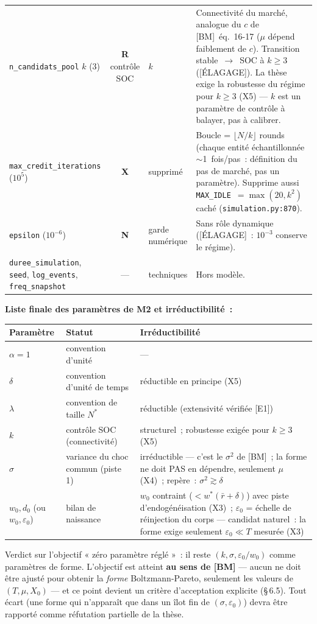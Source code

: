 \documentclass[11pt,a4paper]{article}
\begin{document}
\begin{xltabular}{\linewidth}{@{}>{\raggedright\arraybackslash}p{3.1cm}c>{\raggedright\arraybackslash}p{2.7cm}X@{}}
\texttt{n_candidats_pool} $k$ (3) & \textbf{R} contrôle SOC & $k$ & Connectivité du marché, analogue du $c$ de [BM]~éq.~16-17 ($\mu$ dépend faiblement de $c$). Transition stable~$\to$~SOC à $k\geq 3$ ([ÉLAGAGE]). La thèse exige la robustesse du régime pour $k\geq 3$ (X5) --- $k$ est un paramètre de contrôle à balayer, pas à calibrer. \\
\texttt{max_credit_iterations} ($10^5$) & \textbf{X} & supprimé & Boucle = $\lfloor N/k \rfloor$ rounds (chaque entité échantillonnée $\sim$1~fois/pas~: définition du pas de marché, pas un paramètre). Supprime aussi \texttt{MAX_IDLE}~$= \max(20,k^2)$ caché (\texttt{simulation.py:870}). \\
\texttt{epsilon} ($10^{-6}$) & \textbf{N} & garde numérique & Sans rôle dynamique ([ÉLAGAGE]~: $10^{-3}$ conserve le régime). \\
\texttt{duree_simulation}, \texttt{seed}, \texttt{log_events}, \texttt{freq_snapshot} & --- & techniques & Hors modèle. \\
\bottomrule
\end{xltabular}

\medskip
\textbf{Liste finale des paramètres de M2 et irréductibilité~:}

\begin{xltabular}{\linewidth}{@{}l>{\raggedright\arraybackslash}p{3.4cm}X@{}}
\toprule
Paramètre & Statut & Irréductibilité \\
\midrule
\endhead
$\alpha=1$ & convention d'unité & --- \\
$\delta$ & convention d'unité de temps & réductible en principe (X5) \\
$\lambda$ & convention de taille $N^*$ & réductible (extensivité vérifiée [E1]) \\
$k$ & contrôle SOC (connectivité) & structurel~; robustesse exigée pour $k\geq 3$ (X5) \\
$\sigma$ & variance du choc commun (piste 1) & irréductible --- c'est le $\sigma^2$ de [BM]~; la forme ne doit PAS en dépendre, seulement $\mu$ (X4)~; repère~: $\sigma^2\gtrsim\delta$ \\
$w_0, d_0$ (ou $w_0,\varepsilon_0$) & bilan de naissance & $w_0$ contraint ($<w^*(\bar r+\delta)$) avec piste d'endogénéisation (X3)~; $\varepsilon_0$ = échelle de réinjection du corps --- candidat naturel~: la forme exige seulement $\varepsilon_0\ll T$ mesurée (X3) \\
\bottomrule
\end{xltabular}

\medskip
Verdict sur l'objectif « zéro paramètre réglé »~: il reste $(k,\sigma,\varepsilon_0/w_0)$ comme paramètres de forme. L'objectif est atteint \textbf{au sens de [BM]} --- aucun ne doit être ajusté pour obtenir la \emph{forme} Boltzmann-Pareto, seulement les valeurs de $(T,\mu,X_0)$ --- et ce point devient un critère d'acceptation explicite (\S\,6.5). Tout écart (une forme qui n'apparaît que dans un îlot fin de $(\sigma,\varepsilon_0)$) devra être rapporté comme réfutation partielle de la thèse.
\end{document}

